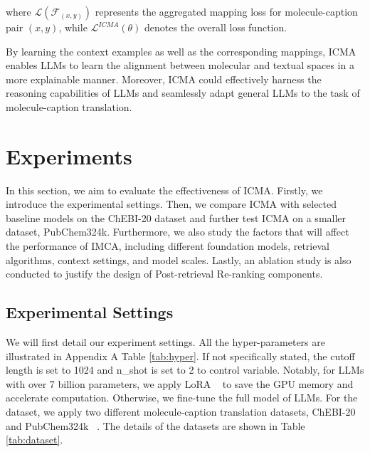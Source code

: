 \noindent where $\mathcal{L}(\mathcal{F}_{(x,y)})$ represents the aggregated mapping loss for molecule-caption pair $(x,y)$, while $\mathcal{L}^{I\!C\!M\!A}(\theta)$ denotes the overall loss function.

By learning the context examples as well as the corresponding mappings, ICMA enables LLMs to learn the alignment between molecular and textual spaces in a more explainable manner. Moreover, ICMA could effectively harness the reasoning capabilities of LLMs and seamlessly adapt general LLMs to the task of molecule-caption translation.
\section{Experiments}
\label{sec:Experiments}
In this section, we aim to evaluate the effectiveness of ICMA. Firstly, we introduce the experimental settings.
Then, we compare ICMA with selected baseline models on the ChEBI-20 dataset and further test ICMA on a smaller dataset, PubChem324k.
Furthermore, we also study the factors that will affect the performance of IMCA, including different foundation models, retrieval algorithms, context settings, and model scales.
Lastly, an ablation study is also conducted to justify the design of Post-retrieval Re-ranking components.

\subsection{Experimental Settings}
We will first detail our experiment settings. 
All the hyper-parameters are illustrated in Appendix A Table \ref{tab:hyper}. If not specifically stated, the cutoff length is set to 1024 and n\_shot is set to 2 to control variable. Notably, for LLMs with over 7 billion parameters, we apply LoRA ~\cite{hu2021lora} to save the GPU memory and accelerate computation. Otherwise, we fine-tune the full model of LLMs. For the dataset, we apply two different molecule-caption translation datasets,
ChEBI-20 ~\cite{edwards2021text2mol} and PubChem324k ~\cite{liu2023molca}. The details of the datasets are shown in Table \ref{tab:dataset}. 
\begin{table}[htb]
    \centering
    \vskip -0.05in
    \vskip -0.1in
    \caption{Details of the datasets, ChEBI-20 and PubChem324k. For PubChem324k, we follow the split in ~\citet{liu2023molca}, while ignoring the \emph{Pretrain} fold.}
    \label{tab:dataset}
    \vskip -0.1in
\end{table}

